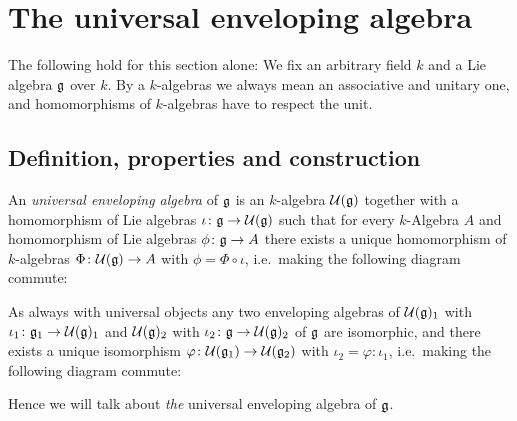 \section{The universal enveloping algebra}
The following hold for this section alone: We fix an arbitrary field $k$ and a Lie algebra $\mathfrak{g}$ over $k$. By a $k$-algebras we always mean an associative and unitary one, and homomorphisms of $k$-algebras have to respect the unit.





\subsection{Definition, properties and construction}


\begin{defi}
 An \emph{universal enveloping algebra} of $\mathfrak{g}$ is an $k$-algebra $\mathcal{U}(\mathfrak{g})$ together with a homomorphism of Lie algebras $\iota \colon \mathfrak{g} \to \mathcal{U}(\mathfrak{g})$ such that for every $k$-Algebra $A$ and homomorphism of Lie algebras $\phi \colon \mathfrak{g} \to A$ there exists a unique homomorphism of $k$-algebras $\Phi \colon \mathcal{U}(\mathfrak{g}) \to A$ with $\phi = \Phi \circ \iota$, i.e.\ making the following diagram commute:
 \begin{center}
 \end{center}
\end{defi}


\begin{rem}
 As always with universal objects any two enveloping algebras of $\mathcal{U}(\mathfrak{g})_1$ with $\iota_1 \colon \mathfrak{g}_1 \to \mathcal{U}(\mathfrak{g})_1$ and $\mathcal{U}(\mathfrak{g})_2$ with $\iota_2 \colon \mathfrak{g} \to \mathcal{U}(\mathfrak{g})_2$ of $\mathfrak{g}$ are isomorphic, and there exists a unique isomorphism $\varphi \colon \mathcal{U}(\mathfrak{g}_1) \to \mathcal{U}(\mathfrak{g}_2)$ with $\iota_2 = \varphi \colon \iota_1$, i.e.\ making the following diagram commute:
 \begin{center}
 \end{center}
 Hence we will talk about \emph{the} universal enveloping algebra of $\mathfrak{g}$.
\end{rem}


